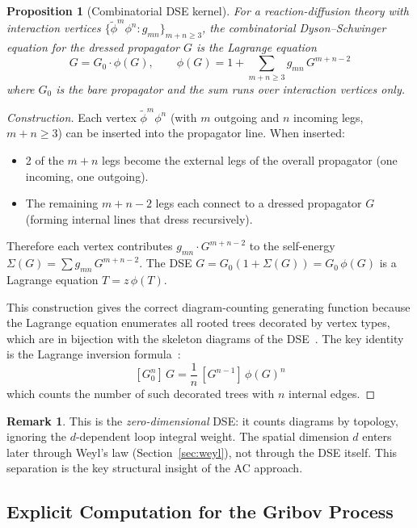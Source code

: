 \documentclass[11pt,a4paper]{article}
\newtheorem{proposition}[theorem]{Proposition}
\theoremstyle{definition}
\newtheorem*{remark}{Remark}
\newcommand{\phit}{\tilde{\phi}}
\begin{document}
\begin{proposition}[Combinatorial DSE kernel]
\label{prop:auto_dse}
For a reaction-diffusion theory with interaction vertices
$\{\phit^m \phi^n : g_{mn}\}_{m+n \geq 3}$, the combinatorial
Dyson--Schwinger equation for the dressed propagator $G$ is the
Lagrange equation
\begin{equation}
\boxed{G = G_0 \cdot \phi(G), \qquad
\phi(G) = 1 + \sum_{m+n \geq 3} g_{mn}\, G^{m+n-2}}
\label{eq:auto_dse}
\end{equation}
where $G_0$ is the bare propagator and the sum runs over interaction
vertices only.
\end{proposition}

\begin{proof}[Construction]
Each vertex $\phit^m \phi^n$ (with $m$ outgoing and $n$ incoming legs,
$m + n \geq 3$) can be inserted into the propagator line. When inserted:
\begin{itemize}
\item 2 of the $m{+}n$ legs become the external legs of the overall
      propagator (one incoming, one outgoing).
\item The remaining $m + n - 2$ legs each connect to a dressed propagator
      $G$ (forming internal lines that dress recursively).
\end{itemize}
Therefore each vertex contributes $g_{mn} \cdot G^{m+n-2}$ to the
self-energy $\Sigma(G) = \sum g_{mn}\, G^{m+n-2}$.
The DSE $G = G_0 (1 + \Sigma(G)) = G_0\, \phi(G)$ is a Lagrange
equation $T = z\,\phi(T)$.

This construction gives the correct diagram-counting generating function
because the Lagrange equation enumerates all rooted trees decorated by
vertex types, which are in bijection with the skeleton diagrams of the
DSE~\cite{yeats2017}. The key identity is the Lagrange inversion
formula~\cite{flajolet2009}:
\[
[G_0^n]\, G = \frac{1}{n}\, [G^{n-1}]\, \phi(G)^n
\]
which counts the number of such decorated trees with $n$ internal edges.
\end{proof}

\begin{remark}
This is the \emph{zero-dimensional} DSE: it counts diagrams by topology,
ignoring the $d$-dependent loop integral weight. The spatial dimension $d$
enters later through Weyl's law (Section~\ref{sec:weyl}), not through the
DSE itself. This separation is the key structural insight of the AC approach.
\end{remark}

\subsection{Explicit Computation for the Gribov Process}
\end{document}
